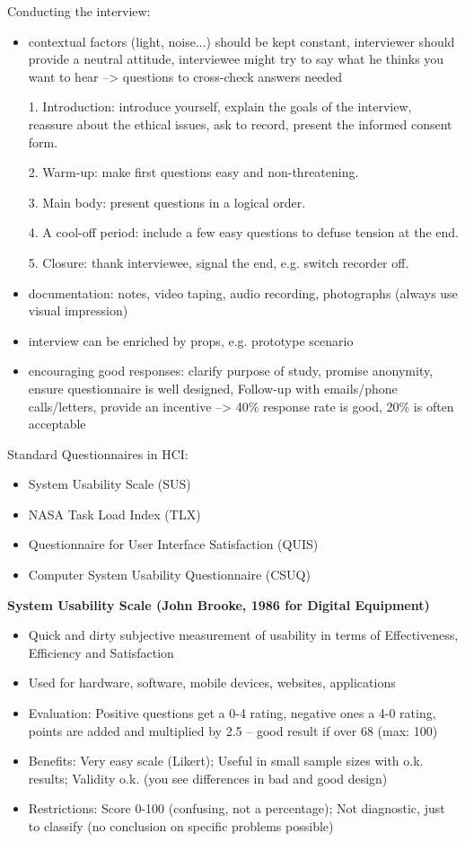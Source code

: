 Conducting the interview:
\begin{itemize}
\item contextual factors (light, noise...) should be kept constant, interviewer should provide a neutral attitude, interviewee might try to say what he thinks you want to hear --> questions to cross-check answers needed
\item[1.] Introduction: introduce yourself, explain the goals of the interview, reassure about the ethical issues, ask to record, present the informed consent form.
\item[2.] Warm-up: make first questions easy and non-threatening.
\item[3.] Main body: present questions in a logical order.
\item[4.] A cool-off period: include a few easy questions to defuse tension at the end.
\item[5.] Closure: thank interviewee, signal the end, e.g. switch recorder off.
\item documentation: notes, video taping, audio recording, photographs (always use visual impression)
\item interview can be enriched by props, e.g. prototype scenario
\item encouraging good responses: clarify purpose of study, promise anonymity, ensure questionnaire is well designed, Follow-up with emails/phone calls/letters, provide an incentive
--> 40\% response rate is good, 20\% is often acceptable
\end{itemize}
Standard Questionnaires in HCI:
\begin{itemize}
\item System Usability Scale (SUS)
\item NASA Task Load Index (TLX)
\item Questionnaire for User Interface Satisfaction (QUIS)
\item Computer System Usability Questionnaire (CSUQ)
\end{itemize}
\textbf{System Usability Scale (John Brooke, 1986 for Digital Equipment) }
\begin{itemize}
\item Quick and dirty subjective measurement of usability in terms of Effectiveness, Efficiency and Satisfaction
\item Used for hardware, software, mobile devices, websites, applications
\item Evaluation: Positive questions get a 0-4 rating, negative ones a 4-0 rating, points are added and multiplied by 2.5 -- good result if over 68 (max: 100)
\item Benefits: Very easy scale (Likert); Useful in small sample sizes with o.k. results; Validity o.k. (you see differences in bad and good design)
\item Restrictions: Score 0-100 (confusing, not a percentage); Not diagnostic, just to classify (no conclusion on specific problems possible)
\end{itemize}
